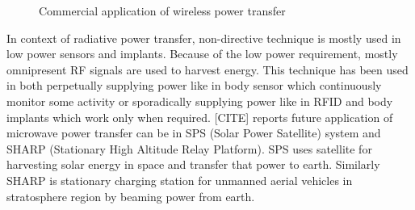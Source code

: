 \documentclass[UKenglish]{ifimaster}  %
\begin{document}
\begin{figure} [htbp]
  \begin{minipage}{\linewidth}
  \centering 
  \hfill
 \hfill
 \end{minipage}\par\medskip
 \centering
 \caption{Commercial application of wireless power transfer} 
\label{wpt_application} 
\end{figure}

In context of radiative power transfer, non-directive technique is mostly used in low power sensors and implants. 
Because of the low power requirement, mostly omnipresent RF signals are used to harvest energy. This technique 
has been used in both perpetually supplying power like in body sensor which continuously monitor some activity 
or sporadically supplying power like in RFID and body implants which work only when required. [CITE] reports 
future application of microwave power transfer can be in SPS (Solar Power Satellite) system and SHARP (Stationary 
High Altitude Relay Platform). SPS uses satellite for harvesting solar energy in space and transfer that power 
to earth. Similarly SHARP is stationary charging station for unmanned aerial vehicles in stratosphere region by 
beaming power from earth.    \\
\end{document}
